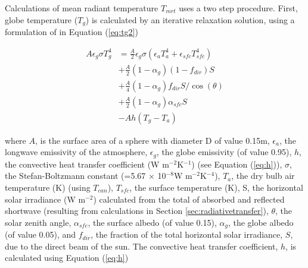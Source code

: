 \documentclass[final,3p,times,authoryear]{elsarticle}
\begin{document}

Calculations of mean radiant temperature $T_{mrt}$ uses a two step procedure. First, globe temperature ($T_{g}$) is calculated by an iterative relaxation solution, using a formulation of \cite{Liljegren2008} in Equation (\ref{eq:tg2}) 


\begin{equation}\label{eq:tg2}
\begin{split}
A\epsilon_{g}\sigma T_{g}^{4} &= \frac{A}{2} \epsilon_{g}\sigma( \epsilon_{a} T_{a}^{4} +  \epsilon_{sfc} T_{sfc}^{4} ) \\
&+ \frac{A}{2}( 1-\alpha_{g})(1-f_{dir})S  \\
&+ \frac{A}{4}( 1-\alpha_{g})f_{dir}S /\cos(\theta) \\
&+ \frac{A}{2}( 1-\alpha_{g})\alpha_{sfc}S \\
&- Ah(T_{g}-T_{a})   
\end{split}
\end{equation}

where $A$, is the surface area of a sphere with diameter D of value 0.15m,
$\epsilon_{a}$, the longwave emissivity of the atmosphere, 
$\epsilon_{g}$, the globe emissivity (of value 0.95), 
$h$, the convective heat transfer coefficient (W m$^{-2}$K$^{-1}$) (see Equation (\ref{eq:h})), 
$\sigma$, the Stefan-Boltzmann constant (=5.67 $\times$ 10$^{-8}$W m$^{-2}$K$^{-4}$), 
$T_{a}$, the dry bulb air temperature (K) (using $T_{can}$), 
$T_{sfc}$, the surface temperature (K), 
S, the horizontal solar irradiance (W m$^{-2}$) calculated from the total of absorbed and reflected shortwave (resulting from calculations in Section \ref{sec:radiativetransfer}), 
$\theta$, the solar zenith angle, 
$\alpha_{sfc}$, the surface albedo (of value 0.15),  
$\alpha_{g}$, the globe albedo (of value 0.05), and 
$f_{dir}$, the fraction of the total horizontal solar irradiance, $S$, due to the direct
beam of the sun. The convective heat transfer coefficient, $h$, is calculated using Equation (\ref{eq:h})
\end{document}
